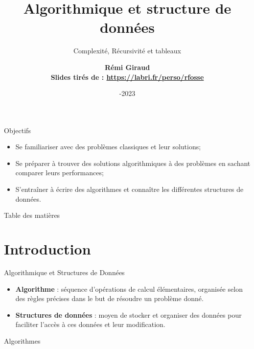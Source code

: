 \documentclass[10pt,xcolor=dvipsnames]{beamer}
\title{
Algorithmique et structure de données
}
\subtitle{Complexité, Récursivité et tableaux}
\date{\centering 2022-2023}
\author{\centering \bf Rémi Giraud \\[2ex]
{\normalfont Slides tirés de : \underline{https://labri.fr/perso/rfosse}}\\[3ex]}
\begin{document}
\maketitle



  \begin{frame}{Objectifs}
  
  \vspace{-0.5cm}
  
      \begin{itemize}
          \item Se familiariser avec des problèmes classiques et leur solutions;
          \item Se préparer à trouver des solutions algorithmiques à des problèmes en sachant comparer leurs performances;
          \item S'entraîner à écrire des algorithmes et connaître les différentes structures de données.
      \end{itemize}
  \end{frame}
  

  \begin{frame}{Table des matières}
  \tableofcontents   
  \end{frame}





\section{Introduction}
\begin{frame}{Algorithmique et Structures de Données}
  \begin{itemize}
  \item \textbf{Algorithme}  : séquence d'opérations de calcul élémentaires, organisée selon des règles précises dans le but de résoudre un problème donné.
  \item \textbf{Structures de données} : moyen de stocker et organiser des données pour faciliter l'accès à ces données et leur modification.
  \end{itemize}
\end{frame}

\begin{frame}
  \begin{center}
    {\alert{\huge{Algorithmes}}}
  \end{center}
\end{frame}
\end{document}

